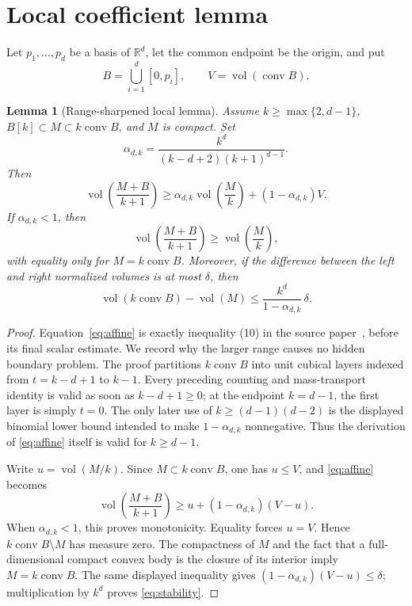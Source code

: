 \documentclass[11pt]{article}
\newtheorem{lemma}[theorem]{Lemma}
\newcommand{\R}{\mathbb R}
\newcommand{\vol}{\operatorname{vol}}
\newcommand{\conv}{\operatorname{conv}}
\begin{document}
\section{Local coefficient lemma}

Let $p_1,\ldots,p_d$ be a basis of $\R^d$, let the common endpoint be the
origin, and put
\[
 B=\bigcup_{i=1}^d[0,p_i],\qquad V=\vol(\conv B).
\]

\begin{lemma}[Range-sharpened local lemma]\label{lem:local}
Assume $k\ge\max\{2,d-1\}$, $B[k]\subset M\subset k\conv B$, and $M$ is
compact.  Set
\[
                 \alpha_{d,k}=\frac{k^d}{(k-d+2)(k+1)^{d-1}}.
\]
Then
\begin{equation}\label{eq:affine}
 \vol\!\left(\frac{M+B}{k+1}\right)
 \ge \alpha_{d,k}\vol\!\left(\frac{M}{k}\right)
 +(1-\alpha_{d,k})V.
\end{equation}
If $\alpha_{d,k}<1$, then
\[
 \vol\!\left(\frac{M+B}{k+1}\right)
 \ge \vol\!\left(\frac{M}{k}\right),
\]
with equality only for $M=k\conv B$.  Moreover, if the difference between
the left and right normalized volumes is at most $\delta$, then
\begin{equation}\label{eq:stability}
 \vol(k\conv B)-\vol(M)
 \le \frac{k^d}{1-\alpha_{d,k}}\,\delta.
\end{equation}
\end{lemma}

\begin{proof}
Equation~\eqref{eq:affine} is exactly inequality (10) in the source
paper~\cite{FLZ}, before its final scalar estimate.  We record why the larger
range causes no hidden boundary problem.  The proof partitions $k\conv B$
into unit cubical layers indexed from $t=k-d+1$ to $k-1$.  Every preceding
counting and mass-transport identity is valid as soon as $k-d+1\ge0$; at the
endpoint $k=d-1$, the first layer is simply $t=0$.  The only later use of
$k\ge(d-1)(d-2)$ is the displayed binomial lower bound intended to make
$1-\alpha_{d,k}$ nonnegative.  Thus the derivation of \eqref{eq:affine}
itself is valid for $k\ge d-1$.

Write $u=\vol(M/k)$.  Since $M\subset k\conv B$, one has $u\le V$, and
\eqref{eq:affine} becomes
\[
 \vol\!\left(\frac{M+B}{k+1}\right)
 \ge u+(1-\alpha_{d,k})(V-u).
\]
When $\alpha_{d,k}<1$, this proves monotonicity.  Equality forces $u=V$.
Hence $k\conv B\setminus M$ has measure zero.  The compactness of $M$ and
the fact that a full-dimensional compact convex body is the closure of its
interior imply $M=k\conv B$.  The same displayed inequality gives
$(1-\alpha_{d,k})(V-u)\le\delta$; multiplication by $k^d$ proves
\eqref{eq:stability}.
\end{proof}
\end{document}
